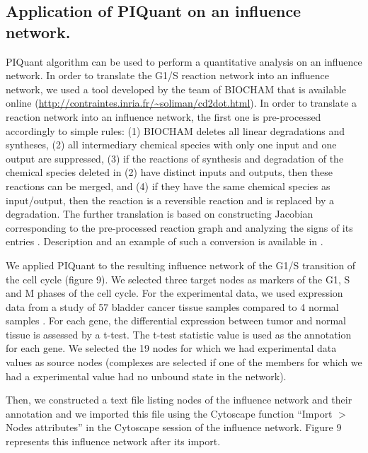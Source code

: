 \documentclass[10pt]{bmc_article}
\newenvironment{bmcformat}{\baselineskip20pt\sloppy\setboolean{publ}{false}}{\baselineskip20pt\sloppy}
\begin{document}
\begin{bmcformat}
\subsection*{Application of PIQuant on an influence network.}
PIQuant algorithm can be used to perform a quantitative analysis on an influence
network. In order to translate the G1/S reaction network into an influence network, we used
a tool developed by the team of BIOCHAM \cite{calzone2006biocham} that is
available online (\url{http://contraintes.inria.fr/~soliman/cd2dot.html}). In order to translate a reaction network into an influence network, the first one is 
pre-processed accordingly to simple rules: (1) BIOCHAM deletes all linear
degradations and syntheses, (2) all intermediary chemical species with only one input and
one output are suppressed, (3) if the reactions of synthesis and degradation of
the chemical species deleted in (2) have distinct inputs and outputs, then these reactions
can be merged, and (4) if they have the same chemical species as input/output, then the reaction is a
reversible reaction and is replaced by a degradation. The further
translation is based on constructing Jacobian corresponding to the pre-processed reaction graph
and analyzing the signs of its entries \cite{fages2008frontiers}. Description and an example of such a conversion is
available in \cite{calzone2011calamar}.

We applied PIQuant to the resulting influence network of the G1/S transition of
the cell cycle (figure 9). We selected three target nodes as
markers of the G1, S and M
phases of the cell cycle. For the experimental data, we used expression data
from a study of 57 bladder cancer
tissue samples compared to 4 normal samples \cite{stransky2006regional}. For
each gene, the differential expression between tumor and normal tissue
is assessed by a t-test. The t-test statistic value is used as the annotation
for each gene. We selected the 19 nodes for which we had experimental data
values as source nodes (complexes are selected if one of the members for which
we had a experimental value had no unbound state in the network).

Then, we constructed a text file listing nodes of the influence network
and their annotation and we imported this file using the Cytoscape function
``Import $>$ Nodes attributes''
in the Cytoscape session of the influence network.
Figure 9 represents this influence network after its import.


\end{bmcformat}
\end{document}
